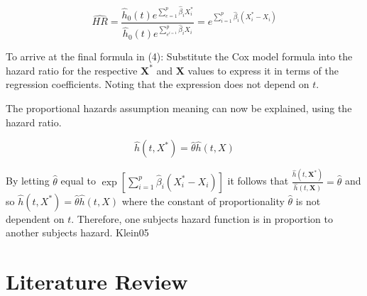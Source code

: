 \documentclass[12pt,twoside]{reedthesis}
\begin{document}
\[\widehat{H R}=\frac{\hat{h}_{0}(t) e^{\sum_{e=1}^{p} \hat{\beta}_{i} X_{i}^{*}}}{\hat{h}_{0}(t) e^{\sum_{e^{i=1}}^{p} \hat{\beta}_{i} X_{i}}}=e^{\sum_{i=1}^{p} \hat{\beta}_{i}\left(X_{i}^{*}-X_{i}\right)}\]

To arrive at the final formula in (4): Substitute the Cox model formula into the hazard ratio for the respective \(\mathbf{X}^{*}\) and \(\mathbf{X}\) values to express it in terms of the regression coefficients. Noting that the expression does not depend on \(\textit{t}\).

The proportional hazards assumption meaning can now be explained, using the hazard ratio.

\[\hat{h}\left(t, X^{*}\right)=\hat{\theta} \hat{h}(t, X)\]

By letting \(\hat{\theta}\) equal to \(\exp \left[\sum_{i=1}^{p} \hat{\beta}_{i}\left(X_{i}^{*}-X_{i}\right)\right]\) it follows that \(\frac{\hat{h}\left(t, \mathbf{X}^{*}\right)}{\hat{h}(t, \mathbf{X})}=\hat{\theta}\) and so \(\hat{h}\left(t, X^{*}\right)=\hat{\theta} \hat{h}(t, X)\) where the constant of proportionality \(\hat{\theta}\) is not dependent on \(\textit{t}\). Therefore, one subjects hazard function is in proportion to another subjects hazard.
Klein05

\hypertarget{rmd-basics}{%
\chapter{Literature Review}\label{rmd-basics}}
\end{document}
